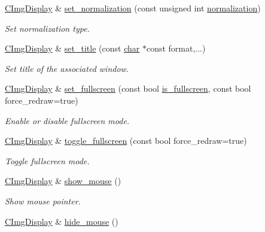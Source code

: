 \begin{DoxyCompactItemize}
\hyperlink{structcimg__library__suffixed_1_1CImgDisplay}{C\+Img\+Display} \& \hyperlink{structcimg__library__suffixed_1_1CImgDisplay_a42bb3207015fb21b5898c299824cbbfc}{set\+\_\+normalization} (const unsigned int \hyperlink{structcimg__library__suffixed_1_1CImgDisplay_a79b6f929fe4aaf411051fc85862191a7}{normalization})
\begin{DoxyCompactList}\small\item\em Set normalization type. \end{DoxyCompactList}\item 
\hyperlink{structcimg__library__suffixed_1_1CImgDisplay}{C\+Img\+Display} \& \hyperlink{structcimg__library__suffixed_1_1CImgDisplay_ada6a7944d74a9e97e57dc22c936c68ab}{set\+\_\+title} (const \hyperlink{classchar}{char} $\ast$const format,...)
\begin{DoxyCompactList}\small\item\em Set title of the associated window. \end{DoxyCompactList}\item 
\hyperlink{structcimg__library__suffixed_1_1CImgDisplay}{C\+Img\+Display} \& \hyperlink{structcimg__library__suffixed_1_1CImgDisplay_ad36ec47ee020691298c13340ca35da39}{set\+\_\+fullscreen} (const bool \hyperlink{structcimg__library__suffixed_1_1CImgDisplay_a1de2d56a94961193ef833b502120d67e}{is\+\_\+fullscreen}, const bool force\+\_\+redraw=true)
\begin{DoxyCompactList}\small\item\em Enable or disable fullscreen mode. \end{DoxyCompactList}\item 
\hyperlink{structcimg__library__suffixed_1_1CImgDisplay}{C\+Img\+Display} \& \hyperlink{structcimg__library__suffixed_1_1CImgDisplay_a1f98bd17638afff76af6bb94af98b73a}{toggle\+\_\+fullscreen} (const bool force\+\_\+redraw=true)
\begin{DoxyCompactList}\small\item\em Toggle fullscreen mode. \end{DoxyCompactList}\item 
\hyperlink{structcimg__library__suffixed_1_1CImgDisplay}{C\+Img\+Display} \& \hyperlink{structcimg__library__suffixed_1_1CImgDisplay_ac1d14f9181bff9e87ff95deb4ec752a5}{show\+\_\+mouse} ()
\begin{DoxyCompactList}\small\item\em Show mouse pointer. \end{DoxyCompactList}\item 
\hyperlink{structcimg__library__suffixed_1_1CImgDisplay}{C\+Img\+Display} \& \hyperlink{structcimg__library__suffixed_1_1CImgDisplay_ad42869bba3895a98404a7deade4690f1}{hide\+\_\+mouse} ()

\end{DoxyCompactItemize}
